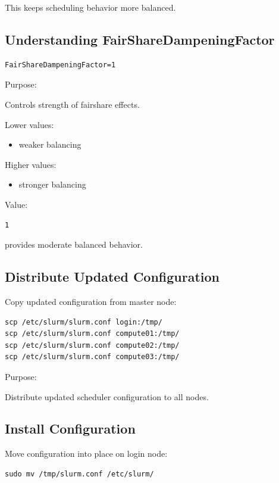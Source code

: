 \documentclass[11pt]{article}
\begin{document}
This keeps scheduling behavior more balanced.
\subsection{Understanding FairShareDampeningFactor}
\label{sec:orgee263d1}

\begin{verbatim}
FairShareDampeningFactor=1
\end{verbatim}

Purpose:

Controls strength of fairshare effects.

Lower values:

\begin{itemize}
\item weaker balancing
\end{itemize}

Higher values:

\begin{itemize}
\item stronger balancing
\end{itemize}

Value:

\begin{verbatim}
1
\end{verbatim}

provides moderate balanced behavior.
\subsection{Distribute Updated Configuration}
\label{sec:org8d425de}

Copy updated configuration from master node:

\begin{verbatim}
scp /etc/slurm/slurm.conf login:/tmp/
scp /etc/slurm/slurm.conf compute01:/tmp/
scp /etc/slurm/slurm.conf compute02:/tmp/
scp /etc/slurm/slurm.conf compute03:/tmp/
\end{verbatim}

Purpose:

Distribute updated scheduler configuration to all nodes.
\subsection{Install Configuration}
\label{sec:org3789fb9}

Move configuration into place on login node:

\begin{verbatim}
sudo mv /tmp/slurm.conf /etc/slurm/
\end{verbatim}
\end{document}

